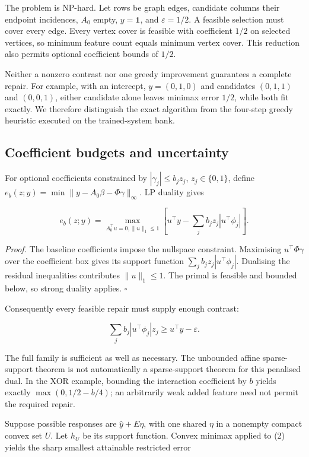 \documentclass[
  british,
  11pt,
  a4paper,
]{article}
\newcounter{none} %
\begin{document}
The problem is NP-hard. Let rows be graph edges, candidate columns their
endpoint incidences, \(A_0\) empty, \(y=\mathbf1\), and
\(\varepsilon=1/2\). A feasible selection must cover every edge. Every
vertex cover is feasible with coefficient \(1/2\) on selected vertices,
so minimum feature count equals minimum vertex cover. This reduction
also permits optional coefficient bounds of \(1/2\).

Neither a nonzero contrast nor one greedy improvement guarantees a
complete repair. For example, with an intercept, \(y=(0,1,0)\) and
candidates \((0,1,1)\) and \((0,0,1)\), either candidate alone leaves
minimax error \(1/2\), while both fit exactly. We therefore distinguish
the exact algorithm from the four-step greedy heuristic executed on the
trained-system bank.

\subsection{Coefficient budgets and
uncertainty}\label{coefficient-budgets-and-uncertainty}

For optional coefficients constrained by \(|\gamma_j|\le b_jz_j\),
\(z_j\in\{0,1\}\), define
\(e_b(z;y)=\min\|y-A_0\beta-\Phi\gamma\|_\infty\). LP duality gives

\[
e_b(z;y)=\max_{A_0^\top u=0,\|u\|_1\le1}
\left[u^\top y-\sum_jb_jz_j|u^\top\phi_j|\right].
\tag{2}
\]

\emph{Proof.} The baseline coefficients impose the nullspace constraint.
Maximising \(u^\top\Phi\gamma\) over the coefficient box gives its
support function \(\sum_jb_jz_j|u^\top\phi_j|\). Dualising the residual
inequalities contributes \(\|u\|_1\le1\). The primal is feasible and
bounded below, so strong duality applies. \(\square\)

Consequently every feasible repair must supply enough contrast:

\[\sum_jb_j|u^\top\phi_j|z_j\ge u^\top y-\varepsilon.\]

The full family is sufficient as well as necessary. The unbounded affine
sparse-support theorem is not automatically a sparse-support theorem for
this penalised dual. In the XOR example, bounding the interaction
coefficient by \(b\) yields exactly \(\max(0,1/2-b/4)\); an arbitrarily
weak added feature need not permit the required repair.

Suppose possible responses are \(\widehat y+E\eta\), with one shared
\(\eta\) in a nonempty compact convex set \(U\). Let \(h_U\) be its
support function. Convex minimax applied to (2) yields the sharp
smallest attainable restricted error
\end{document}

